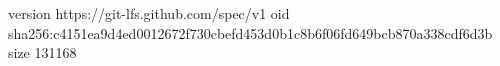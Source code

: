 version https://git-lfs.github.com/spec/v1
oid sha256:c4151ea9d4ed0012672f730cbefd453d0b1c8b6f06fd649bcb870a338cdf6d3b
size 131168
